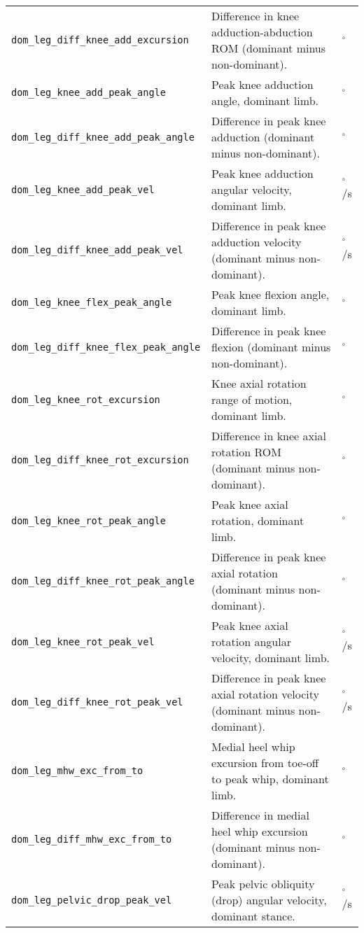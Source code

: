 \begin{longtable}{@{}l p{} l@{}}
    \texttt{dom\_leg\_diff\_knee\_add\_excursion} & Difference in knee adduction-abduction ROM (dominant minus non-dominant). & $^\circ$ \\
    \texttt{dom\_leg\_knee\_add\_peak\_angle} & Peak knee adduction angle, dominant limb. & $^\circ$ \\
    \texttt{dom\_leg\_diff\_knee\_add\_peak\_angle} & Difference in peak knee adduction (dominant minus non-dominant). & $^\circ$ \\
    \texttt{dom\_leg\_knee\_add\_peak\_vel} & Peak knee adduction angular velocity, dominant limb. & $^\circ$/s \\
    \texttt{dom\_leg\_diff\_knee\_add\_peak\_vel} & Difference in peak knee adduction velocity (dominant minus non-dominant). & $^\circ$/s \\
    \texttt{dom\_leg\_knee\_flex\_peak\_angle} & Peak knee flexion angle, dominant limb. & $^\circ$ \\
    \texttt{dom\_leg\_diff\_knee\_flex\_peak\_angle} & Difference in peak knee flexion (dominant minus non-dominant). & $^\circ$ \\
    \texttt{dom\_leg\_knee\_rot\_excursion} & Knee axial rotation range of motion, dominant limb. & $^\circ$ \\
    \texttt{dom\_leg\_diff\_knee\_rot\_excursion} & Difference in knee axial rotation ROM (dominant minus non-dominant). & $^\circ$ \\
    \texttt{dom\_leg\_knee\_rot\_peak\_angle} & Peak knee axial rotation, dominant limb. & $^\circ$ \\
    \texttt{dom\_leg\_diff\_knee\_rot\_peak\_angle} & Difference in peak knee axial rotation (dominant minus non-dominant). & $^\circ$ \\
    \texttt{dom\_leg\_knee\_rot\_peak\_vel} & Peak knee axial rotation angular velocity, dominant limb. & $^\circ$/s \\
    \texttt{dom\_leg\_diff\_knee\_rot\_peak\_vel} & Difference in peak knee axial rotation velocity (dominant minus non-dominant). & $^\circ$/s \\
    \texttt{dom\_leg\_mhw\_exc\_from\_to} & Medial heel whip excursion from toe-off to peak whip, dominant limb. & $^\circ$ \\
    \texttt{dom\_leg\_diff\_mhw\_exc\_from\_to} & Difference in medial heel whip excursion (dominant minus non-dominant). & $^\circ$ \\
    \texttt{dom\_leg\_pelvic\_drop\_peak\_vel} & Peak pelvic obliquity (drop) angular velocity, dominant stance. & $^\circ$/s \\

\end{longtable}
